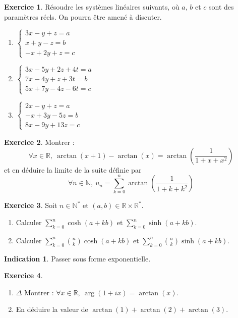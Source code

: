 \documentclass[french]{book}
\newcommand{\N}{\mathbb{N}}
\newcommand{\R}{\mathbb{R}}
\newcommand{\st}{^*}
\theoremstyle{definition}
\newtheorem{ex}{Exercice}[chapter]
\theoremstyle{theorem}
\newtheorem*{ind}{Indication}
\theoremstyle{remark}
\begin{document}
\begin{ex}
	Résoudre les systèmes linéaires suivants, où $a$, $b$ et $c$ sont des paramètres réels. On pourra être amené à discuter.
	\begin{enumerate}
		\item $\displaystyle\begin{cases}
			3x-y+z=a \\
			x+y-z=b \\
			-x+2y+z=c
		\end{cases}$
		\item $\displaystyle\begin{cases}
			3x-5y+2z+4t=a \\
			7x-4y+z+3t=b \\
			5x+7y-4z-6t=c
		\end{cases}$
		\item $\displaystyle\begin{cases}
			2x-y+z=a \\
			-x+3y-5z=b \\
			8x-9y+13z=c
		\end{cases}$
	\end{enumerate}
\end{ex}

\begin{ex}
	Montrer : $$\forall x\in\R,\ \arctan(x+1)-\arctan(x)=\arctan\left(\frac{1}{1+x+x^2}\right)$$ et en déduire la limite de la suite définie par $$\forall n\in\N,\ u_n=\sum_{k=0}^{n}\arctan\left(\frac{1}{1+k+k^2}\right)$$
\end{ex}

\begin{ex}
	Soit $n\in\N\st$ et $(a,b)\in\R\times\R\st$.
	\begin{enumerate}
		\item Calculer $\displaystyle\sum_{k=0}^{n}\cosh(a+kb)$ et $\displaystyle\sum_{k=0}^{n}\sinh(a+kb)$.
		\item Calculer $\displaystyle\sum_{k=0}^{n}\binom{n}{k}\cosh(a+kb)$ et $\displaystyle\sum_{k=0}^{n}\binom{n}{k}\sinh(a+kb)$.
	\end{enumerate}
\end{ex}

\begin{ind}
	Passer sous forme exponentielle.
\end{ind}

\begin{ex}
	\begin{enumerate}
		\item $\Delta$ Montrer : $\forall x\in\R,\ \arg(1+ix)=\arctan(x)$.
		\item En déduire la valeur de $\arctan(1)+\arctan(2)+\arctan(3)$.
	\end{enumerate}
\end{ex}
\end{document}
